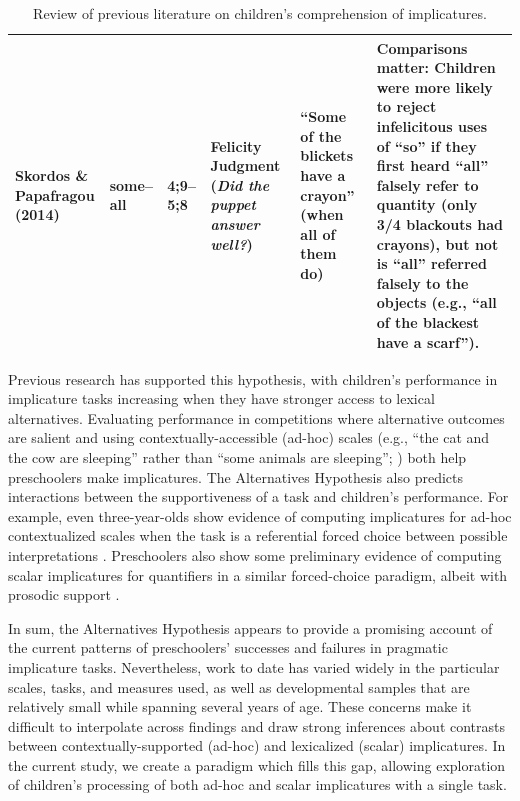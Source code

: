 \documentclass[man]{apa2}
\begin{document}
\begin{landscape}
\begin{table}[!ht]
\begin{tabular}{| p{2.2cm} | p{2cm} | p{1.69cm} | p{4.5cm} | p{5cm} | p{7.2cm} |}
\parbox[t]{2.2cm}{Skordos \&\\Papafragou (2014)} & some--all & 4;9--5;8 & Felicity Judgment (\textit{Did the puppet answer well?}) & ``Some of the blickets have a crayon'' (when all of them do)  & Comparisons matter: Children were more likely to reject infelicitous uses of ``so'' if they first heard ``all'' falsely refer to quantity (only 3/4 blackouts had crayons), but not is ``all'' referred falsely to the objects (e.g., ``all of the blackest have a scarf'').\\ \hline \end{tabular} 
\caption{\label{tab:lit_review}Review of previous literature on children's comprehension of implicatures.} 
\end{table}
\end{landscape}
\restoregeometry


Previous research has supported this hypothesis, with children's performance in implicature tasks increasing when they have stronger access to lexical alternatives. Evaluating performance in competitions where alternative outcomes are salient \cite{papafragou2003} and using contextually-accessible (ad-hoc) scales (e.g., ``the cat and the cow are sleeping'' rather than ``some animals are sleeping''; ) both help preschoolers make implicatures. The Alternatives Hypothesis also predicts interactions between the supportiveness of a task and children's performance. For example, even three-year-olds show evidence of computing implicatures for ad-hoc contextualized scales when the task is a referential forced choice between possible interpretations \cite{stiller2014}.  Preschoolers also show some preliminary evidence of computing scalar implicatures for quantifiers in a similar forced-choice paradigm, albeit with prosodic support \cite{miller2005}. 

In sum, the Alternatives Hypothesis appears to provide a promising account of the current patterns of preschoolers' successes and failures in pragmatic implicature tasks. Nevertheless, work to date has varied widely in the particular scales, tasks, and measures used, as well as developmental samples that are relatively small while spanning several years of age. These concerns make it difficult to interpolate across findings and draw strong inferences about contrasts between contextually-supported (ad-hoc) and lexicalized (scalar) implicatures. In the current study, we create a paradigm which fills this gap, allowing exploration of children's processing of both ad-hoc and scalar implicatures with a single task.
\end{document}
